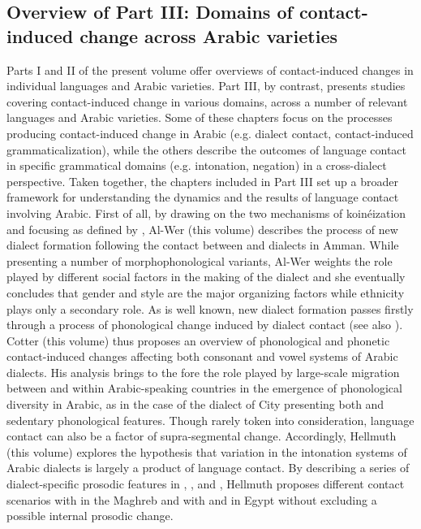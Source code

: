 \documentclass[output=paper]{langsci/langscibook}
\begin{document}
\subsection{Overview of Part III: Domains of contact-induced
change across Arabic varieties}\label{intropartIIIoverview}
Parts I and II of the present volume offer overviews of contact-induced changes in individual languages and Arabic varieties. Part III, by contrast, presents studies covering contact-induced change in various domains, across a number of relevant languages and Arabic varieties. Some of these chapters focus on the processes producing contact-induced change in Arabic (e.g. dialect contact, contact-induced grammaticalization), while the others describe the outcomes of language contact in specific grammatical domains (e.g. intonation, negation) in a cross-dialect perspective. Taken together, the chapters included in Part III set up a broader framework for understanding the dynamics and the results of language contact involving Arabic. 
First of all, by drawing on the two mechanisms of koinéization and focusing as defined by \citet{Trudgill2004}, Al-Wer (this volume) describes the process of new dialect formation following the contact between  and  dialects in Amman. While presenting a number of morphophonological variants, Al-Wer weights the role played by different social factors in the making of the  dialect and she eventually concludes that gender and style are the major organizing factors while ethnicity plays only a secondary role. As is well known, new dialect formation passes firstly through a process of phonological change induced by dialect contact (see also \citeyear{Labov2007}). Cotter (this volume) thus proposes an overview of phonological and phonetic contact-induced changes affecting both consonant and vowel systems of Arabic dialects. His analysis brings to the fore the role played by large-scale migration between and within Arabic-speaking countries in the emergence of phonological diversity in Arabic, as in the case of the dialect of  City presenting both  and sedentary phonological features. Though rarely token into consideration, language contact can also be a factor of supra-segmental change. Accordingly, Hellmuth (this volume) explores the hypothesis that variation in the intonation systems of Arabic dialects is largely a product of language contact. By describing a series of dialect-specific prosodic features in , , and , Hellmuth proposes different contact scenarios with  in the Maghreb and with  and  in Egypt without excluding a possible internal prosodic change. 
\end{document}
